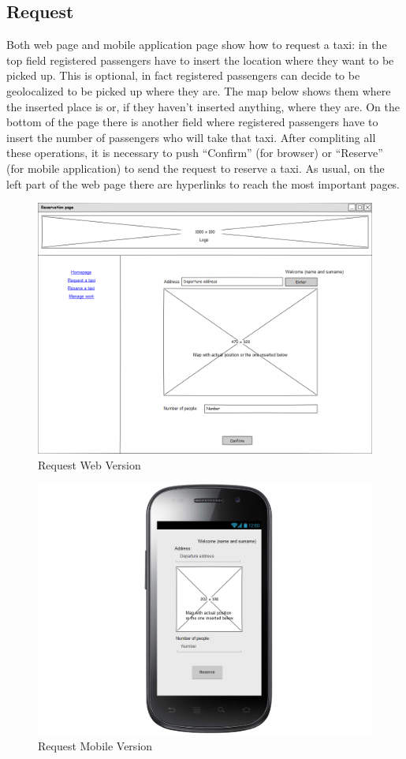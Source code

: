 \subsection{Request}
Both web page and mobile application page show how to request a taxi: in the top field registered passengers have to insert the location where they want to be picked up. This is optional, in fact registered passengers can decide to be geolocalized to be picked up where they are. The map below shows them where the inserted place is or, if they haven't inserted anything, where they are. On the bottom of the page there is another field where registered passengers have to insert the number of passengers who will take that taxi. After compliting all these operations, it is necessary to push ``Confirm'' (for browser) or ``Reserve'' (for mobile application) to send the request to reserve a taxi. \newline As usual, on the left part of the web page there are hyperlinks to reach the most important pages.
\begin{figure}[H]
\centering
\includegraphics[scale=0.35]{mockups/request_web.png}
\caption{Request Web Version}
\end{figure}
\begin{figure}[H]
\centering
\includegraphics[scale=0.35]{mockups/request_mobile.png}
\caption{Request Mobile Version}
\end{figure}
\break
